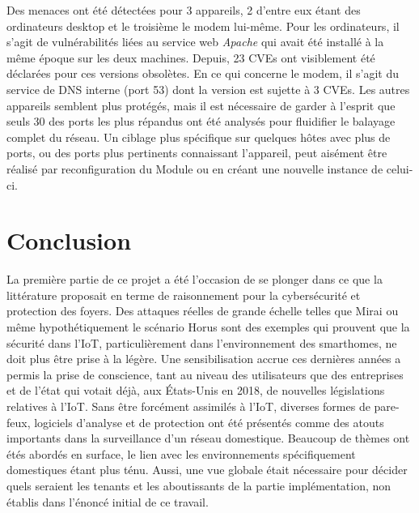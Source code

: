 \documentclass[]{article}
\begin{document}
\par Des menaces ont été détectées pour 3 appareils, 2 d'entre eux étant des ordinateurs desktop et le troisième le modem lui-même. Pour les ordinateurs, il s'agit de vulnérabilités liées au service web \textit{Apache} qui avait été installé à la même époque sur les deux machines. Depuis, 23 CVEs ont visiblement été déclarées pour ces versions obsolètes. En ce qui concerne le modem, il s'agit du service de DNS interne (port 53) dont la version est sujette à 3 CVEs. Les autres appareils semblent plus protégés, mais il est nécessaire de garder à l'esprit que seuls 30 des ports les plus répandus ont été analysés pour fluidifier le balayage complet du réseau. Un ciblage plus spécifique sur quelques hôtes avec plus de ports, ou des ports plus pertinents connaissant l'appareil, peut aisément être réalisé par reconfiguration du Module ou en créant une nouvelle instance de celui-ci.

\newpage

\section{Conclusion}

\par La première partie de ce projet a été l'occasion de se plonger dans ce que la littérature proposait en terme de raisonnement pour la cybersécurité et protection des foyers. Des attaques réelles de grande échelle telles que Mirai ou même hypothétiquement le scénario Horus sont des exemples qui prouvent que la sécurité dans l'IoT, particulièrement dans l'environnement des smarthomes, ne doit plus être prise à la légère. Une sensibilisation accrue ces dernières années a permis la prise de conscience, tant au niveau des utilisateurs que des entreprises et de l'état qui votait déjà, aux États-Unis en 2018, de nouvelles législations relatives à l'IoT\cite{IoTconcern}. Sans être forcément assimilés à l'IoT, diverses formes de pare-feux, logiciels d'analyse et de protection ont été présentés comme des atouts importants dans la surveillance d'un réseau domestique. Beaucoup de thèmes ont étés abordés en surface, le lien avec les environnements spécifiquement domestiques étant plus ténu. Aussi, une vue globale était nécessaire pour décider quels seraient les tenants et les aboutissants de la partie implémentation, non établis dans l'énoncé initial de ce travail.\\
\end{document}
